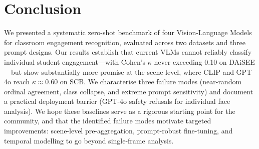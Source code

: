 \section{Conclusion}
\label{sec:conclusion}

We presented a systematic zero-shot benchmark of four Vision-Language
Models for classroom engagement recognition, evaluated across two
datasets and three prompt designs.  Our results establish that current
VLMs cannot reliably classify individual student engagement---with
Cohen's $\kappa$ never exceeding 0.10 on DAiSEE---but show substantially
more promise at the scene level, where CLIP and GPT-4o reach
$\kappa \approx 0.60$ on SCB.  We characterise three failure modes
(near-random ordinal agreement, class collapse, and extreme prompt
sensitivity) and document a practical deployment barrier (GPT-4o safety
refusals for individual face analysis).  We hope these baselines serve
as a rigorous starting point for the community, and that the identified
failure modes motivate targeted improvements: scene-level pre-aggregation,
prompt-robust fine-tuning, and temporal modelling to go beyond
single-frame analysis.
